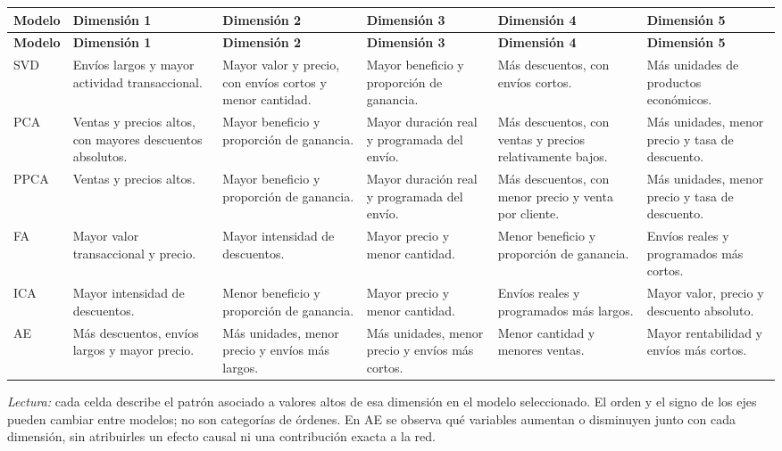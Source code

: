 \documentclass[11pt,a4paper]{article}
\begin{document}
\begingroup
\fontsize{8.3}{10}\selectfont
\setlength{\tabcolsep}{3pt}\renewcommand{\arraystretch}{1.18}
\setlength{\LTpre}{3pt}\setlength{\LTpost}{4pt}
\begin{longtable}{@{}>{\raggedright\arraybackslash}p{1.1cm}*{5}{>{\raggedright\arraybackslash}p{\dimexpr(\textwidth-1.1cm-10\tabcolsep)/5\relax}}@{}}
\toprule
\textbf{Modelo} & \textbf{Dimensión 1} & \textbf{Dimensión 2} & \textbf{Dimensión 3} & \textbf{Dimensión 4} & \textbf{Dimensión 5}\\
\midrule
\endfirsthead
\toprule
\textbf{Modelo} & \textbf{Dimensión 1} & \textbf{Dimensión 2} & \textbf{Dimensión 3} & \textbf{Dimensión 4} & \textbf{Dimensión 5}\\
\midrule
\endhead
\midrule
\endfoot
\bottomrule
\endlastfoot
SVD & Envíos largos y mayor actividad transaccional. & Mayor valor y precio, con envíos cortos y menor cantidad. & Mayor beneficio y proporción de ganancia. & Más descuentos, con envíos cortos. & Más unidades de productos económicos.\\[3pt]
PCA & Ventas y precios altos, con mayores descuentos absolutos. & Mayor beneficio y proporción de ganancia. & Mayor duración real y programada del envío. & Más descuentos, con ventas y precios relativamente bajos. & Más unidades, menor precio y tasa de descuento.\\[3pt]
PPCA & Ventas y precios altos. & Mayor beneficio y proporción de ganancia. & Mayor duración real y programada del envío. & Más descuentos, con menor precio y venta por cliente. & Más unidades, menor precio y tasa de descuento.\\[3pt]
FA & Mayor valor transaccional y precio. & Mayor intensidad de descuentos. & Mayor precio y menor cantidad. & Menor beneficio y proporción de ganancia. & Envíos reales y programados más cortos.\\[3pt]
ICA & Mayor intensidad de descuentos. & Menor beneficio y proporción de ganancia. & Mayor precio y menor cantidad. & Envíos reales y programados más largos. & Mayor valor, precio y descuento absoluto.\\[3pt]
AE & Más descuentos, envíos largos y mayor precio. & Más unidades, menor precio y envíos más largos. & Más unidades, menor precio y envíos más cortos. & Menor cantidad y menores ventas. & Mayor rentabilidad y envíos más cortos.\\
\end{longtable}\par
\textit{Lectura:} cada celda describe el patrón asociado a valores altos de esa dimensión en el modelo seleccionado. El orden y el signo de los ejes pueden cambiar entre modelos; no son categorías de órdenes. En AE se observa qué variables aumentan o disminuyen junto con cada dimensión, sin atribuirles un efecto causal ni una contribución exacta a la red.
\endgroup
\end{document}
